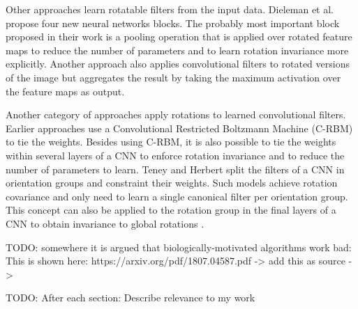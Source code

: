 Other approaches learn rotatable filters from the input data.
Dieleman et al.  propose four new neural networks blocks.
The probably most important block proposed in their work is a pooling operation that is applied over rotated feature maps to  reduce the number of parameters and to learn rotation invariance more explicitly.
Another approach  also applies convolutional filters to rotated versions of the image but aggregates the result by taking the maximum activation over the feature maps as output.

Another category of approaches apply rotations to learned convolutional filters.
Earlier approaches  use a Convolutional Restricted Boltzmann Machine (C-RBM)  to tie the weights.
Besides using C-RBM, it is also possible to tie the weights within several layers of a CNN to enforce rotation invariance and to reduce the number of parameters to learn. 
Teney and Herbert  split the filters of a CNN in orientation groups and constraint their weights.
Such models achieve rotation covariance and only need to learn a single canonical filter per orientation group.
This concept can also be applied to the rotation group in the final layers of a CNN to obtain invariance to global rotations .









TODO: somewhere it is argued that biologically-motivated algorithms work bad: This is shown here: https://arxiv.org/pdf/1807.04587.pdf -> add this as source -> 

TODO: After each section: Describe relevance to my work